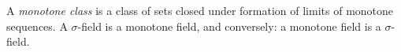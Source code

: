 A \textit{monotone class} is a class of sets closed under formation of limits of monotone sequences. A $\sigma$-field is a monotone field, and conversely: a monotone field is a $\sigma$-field.
